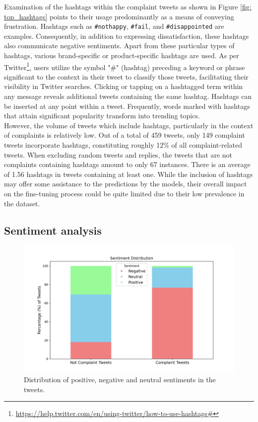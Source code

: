 Examination of the hashtags within the complaint tweets as shown in Figure \ref{fig: top_hashtags} points to their usage predominantly as a means of conveying frustration. Hashtags such as \texttt{\#nothappy}, \texttt{\#fail}, and \texttt{\#disappointed} are examples. Consequently, in addition to expressing dissatisfaction, these hashtags also communicate negative sentiments. Apart from these particular types of hashtags, various brand-specific or product-specific hashtags are used. As per Twitter\footnote{\url{https://help.twitter.com/en/using-twitter/how-to-use-hashtags#}}, users utilize the symbol "\#" (hashtag) preceding a keyword or phrase significant to the context in their tweet to classify those tweets, facilitating their visibility in Twitter searches. Clicking or tapping on a hashtagged term within any message reveals additional tweets containing the same hashtag. Hashtags can be inserted at any point within a tweet. Frequently, words marked with hashtags that attain significant popularity transform into trending topics. \\

However, the volume of tweets which include hashtags, particularly in the context of complaints is relatively low. Out of a total of 459 tweets, only 149 complaint tweets incorporate hashtags, constituting roughly 12\% of all complaint-related tweets. When excluding random tweets and replies, the tweets that are not complaints containing hashtags amount to only 67 instances. There is an average of 1.56 hashtags in tweets containing at least one. While the inclusion of hashtags may offer some assistance to the predictions by the models, their overall impact on the fine-tuning process could be quite limited due to their low prevalence in the dataset.\\

\subsection{Sentiment analysis}
\begin{figure}[htb]
    \centering
    \captionsetup{font=small}
    \includegraphics[width=12cm]{figures/sentiment.png}
    \vspace*{-3mm}
    \caption{Distribution of positive, negative and neutral sentiments in the tweets.}
    \label{fig: sentiment}
\end{figure}

